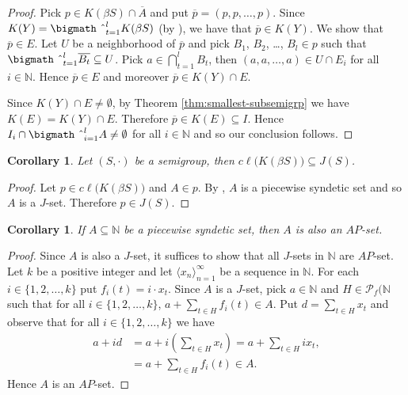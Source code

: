 \documentclass[12pt,showtrims]{memoir}
\theoremstyle{plain}
\newtheorem{cor}[thm]{Corollary}
\theoremstyle{definition}
\newcommand{\la}{\langle}
\newcommand{\ra}{\rangle}
\newcommand{\bbN}{\mathbb{N}}
\newcommand{\Pf}{\mathcal{P}_f}
\newcommand{\bigtimes}{\hbox{\bigmath \char'2}}
\begin{document}
\begin{proof}
  Pick $p \in K(\beta S) \cap \overline{A}$ and put $\overline{p} = (p, p, \ldots, p)$. 
  Since $K(Y) = \bigtimes_{t=1}^l K(\beta S)$ (by \cite[Theorem 2.23]{Hindman:1998fk}), we have that $\overline{p} \in K(Y)$. 
  We show that $\overline{p} \in E$.
  Let $U$ be a neighborhood of $\overline{p}$ and pick $B_1$, $B_2$, \dots, $B_l \in p$ such that $\bigtimes_{t=1}^l \overline{B_t} \subseteq U$. 
  Pick $a \in \bigcap_{t=1}^l B_t$, then $(a, a, \ldots, a) \in U \cap E_i$ for all $i \in \bbN$. 
  Hence $\overline{p} \in E$ and moreover $\overline{p} \in K(Y) \cap E$.

  Since $K(Y) \cap E \ne \emptyset$, by Theorem \ref{thm:smallest-subsemigrp} we have $K(E) = K(Y) \cap E$.
  Therefore $\overline{p} \in K(E) \subseteq I$.
  Hence $I_i \cap \bigtimes_{i=1}^l A \ne \emptyset$ for all $i \in \bbN$ and so our conclusion follows.
\end{proof}

\begin{cor}
  Let $(S, \cdot)$ be a semigroup, then $c\ell\bigl( K(\beta S) \bigr) \subseteq J(S)$.
\end{cor}
\begin{proof}
  Let $p \in c\ell\bigl( K(\beta S) \bigr)$ and $A \in p$.
  By \cite[Corollary 4.41]{Hindman:1998fk}, $A$ is a piecewise syndetic set and so $A$ is a $J$-set.
  Therefore $p \in J(S)$.
\end{proof}

\begin{cor}
  If $A \subseteq \bbN$ be a piecewise syndetic set, then $A$ is also an $AP$-set. 
\end{cor}
\begin{proof}
  Since $A$ is also a $J$-set, it suffices to show that all $J$-sets in $\bbN$ are $AP$-set. 
  Let $k$ be a positive integer and let $\la x_n \ra_{n=1}^\infty$ be a sequence in $\bbN$. 
  For each $i \in \{1, 2, \ldots, k\}$ put $f_i(t) = i \cdot x_t$.
  Since $A$ is a $J$-set, pick $a \in \bbN$ and $H \in \Pf(\bbN$ such that for all $i \in \{1, 2, \ldots, k\}$, $a + \sum_{t \in H} f_i(t) \in A$. 
  Put $d = \sum_{t \in H} x_t$ and observe that for all $i \in \{1, 2, \ldots, k\}$ we have
  \begin{align*}
    a+id &= \textstyle a+ i(\sum_{t \in H} x_t) = a + \sum_{t \in H} ix_t, \\
    &= \textstyle a + \sum_{t \in H} f_i(t) \in A. 
  \end{align*}
  Hence $A$ is an $AP$-set.
\end{proof}
\end{document}
